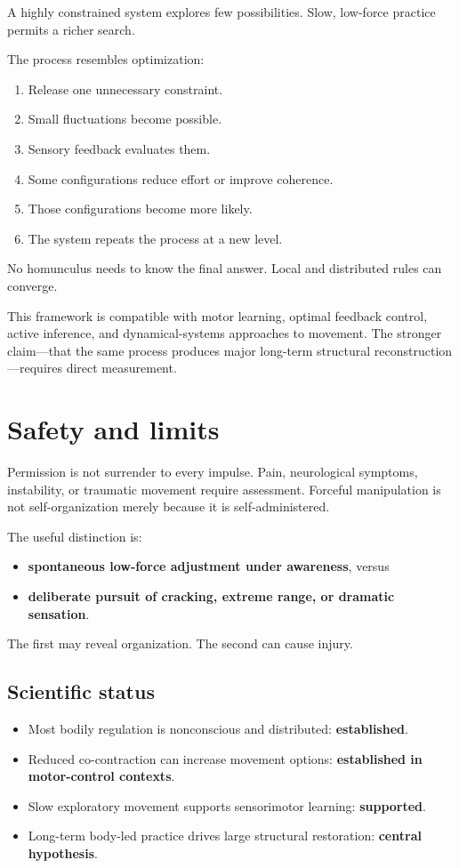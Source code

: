 A highly constrained system explores few possibilities. Slow, low-force practice permits a richer search.

The process resembles optimization:

\begin{enumerate}
\def\labelenumi{\arabic{enumi}.}
\tightlist
\item
  Release one unnecessary constraint.
\item
  Small fluctuations become possible.
\item
  Sensory feedback evaluates them.
\item
  Some configurations reduce effort or improve coherence.
\item
  Those configurations become more likely.
\item
  The system repeats the process at a new level.
\end{enumerate}

No homunculus needs to know the final answer. Local and distributed rules can converge.

This framework is compatible with motor learning, optimal feedback control, active inference, and dynamical-systems approaches to movement. The stronger claim---that the same process produces major long-term structural reconstruction---requires direct measurement.

\section{Safety and limits}

Permission is not surrender to every impulse. Pain, neurological symptoms, instability, or traumatic movement require assessment. Forceful manipulation is not self-organization merely because it is self-administered.

The useful distinction is:

\begin{itemize}
\tightlist
\item
  \textbf{spontaneous low-force adjustment under awareness}, versus
\item
  \textbf{deliberate pursuit of cracking, extreme range, or dramatic sensation}.
\end{itemize}

The first may reveal organization. The second can cause injury.

\subsection{Scientific status}

\begin{itemize}
\tightlist
\item
  Most bodily regulation is nonconscious and distributed: \textbf{established}.
\item
  Reduced co-contraction can increase movement options: \textbf{established in motor-control contexts}.
\item
  Slow exploratory movement supports sensorimotor learning: \textbf{supported}.
\item
  Long-term body-led practice drives large structural restoration: \textbf{central hypothesis}.
\end{itemize}
